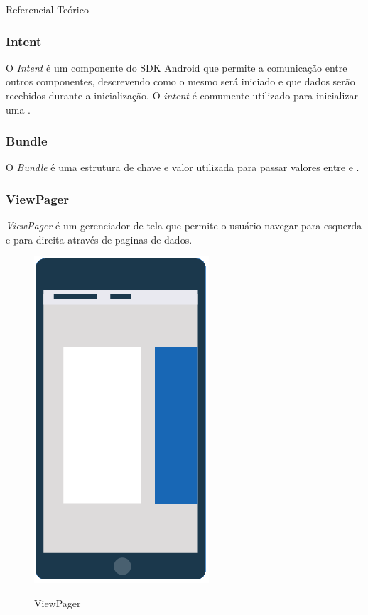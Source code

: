 \documentclass[
	12pt,				%
	openright,			%
	twoside,			%
	a4paper,			%
	english,			%
	french,				%
	spanish,			%
	brazil				%
	]{abntex2}
\begin{document}
\begin{chapter}{Referencial Teórico}
\subsubsection{Intent} \label{Intent}
O \textit{Intent} é um componente do SDK Android que permite a comunicação entre outros componentes, descrevendo como o mesmo será iniciado e que dados serão recebidos durante a inicialização. O \textit{intent} é comumente utilizado para inicializar uma .

\subsubsection{Bundle} \label{Bundle}
O \textit{Bundle} é uma estrutura de chave e valor utilizada para passar valores entre  e .


\newpage
\subsubsection{ViewPager} \label{ViewPager}
\textit{ViewPager} é um gerenciador de tela que permite o usuário navegar para esquerda e para direita através de paginas de dados.
\begin{figure}[h]
\centering
   \caption{ViewPager}
   \includegraphics[scale=0.8]{media/viewpager.jpg}
     \label{fig:viewpager}
\end{figure}


\end{chapter}
\end{document}
